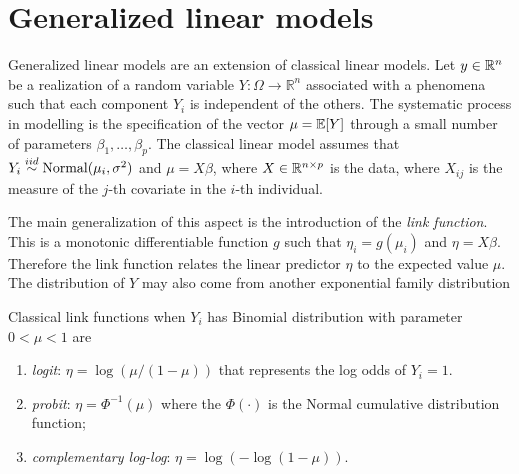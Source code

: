 
\section{Generalized linear models}
\label{sec:glm}

Generalized linear models are an extension of classical linear models. 
Let $y \in \mathbb{R}^{n}$ be a realization of a random variable 
$Y : \Omega \to \mathbb{R}^n$ associated with a phenomena such that each 
component $Y_i$ is independent of the others. The systematic process in 
modelling is the specification of the vector $\mu = \mathbb{E}[Y]$ through a small 
number of parameters $\beta_1, \dots, \beta_p$. The classical linear model 
assumes that $Y_i \overset{iid}{\sim} \operatorname{Normal}(\mu_i, \sigma^2)$ and $\mu = X\beta$,
where $X \in \mathbb{R}^{n \times p}$ is the data, where $X_{ij}$ is the measure 
of the $j$-th covariate in the $i$-th individual. 

The main generalization of this aspect is the introduction of the 
\textit{link function}. This is a monotonic differentiable function $g$ 
such that $\eta_i = g(\mu_i)$ and $\eta = X\beta$. Therefore the link 
function relates the linear predictor $\eta$ to the expected value $\mu$. 
The distribution of $Y$ 
may also come from another exponential family distribution 

Classical link functions when $Y_i$ has Binomial distribution with 
parameter $0 < \mu < 1$ are 

\begin{enumerate}
  \item \textit{logit}: $\eta = \log(\mu / (1 - \mu))$ that represents 
  the log odds of $Y_i = 1$. 
  \item \textit{probit}: $\eta = \Phi^{-1}(\mu)$ where the $\Phi(\cdot)$ 
  is the Normal cumulative distribution function; 
  \item \textit{complementary log-log}: $\eta = \log(-\log(1 - \mu))$.
\end{enumerate}


